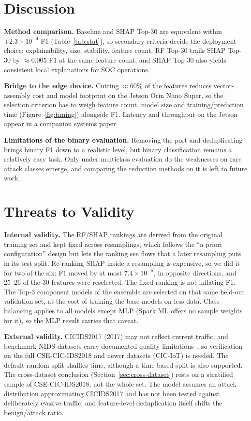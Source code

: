\documentclass[11pt,conference,a4paper]{IEEEtran}
\begin{document}
\section{Discussion}
\label{sec:discuss}

\textbf{Method comparison.} Baseline and SHAP Top-30 are equivalent within $\pm2.3\times10^{-4}$ F1 (Table~\ref{tab:stat}), so secondary criteria decide the deployment choice: explainability, size, stability, feature count. RF Top-30 trails SHAP Top-30 by $\approx$0.005 F1 at the same feature count, and SHAP Top-30 also yields consistent local explanations for SOC operations.

\textbf{Bridge to the edge device.} Cutting $\approx$60\% of the features reduces vector-assembly cost and model footprint on the Jetson Orin Nano Super, so the selection criterion has to weigh feature count, model size and training/prediction time (Figure~\ref{fig:timing}) alongside F1. Latency and throughput on the Jetson appear in a companion systems paper.

\textbf{Limitations of the binary evaluation.} Removing the port and deduplicating brings binary F1 down to a realistic level, but binary classification remains a relatively easy task. Only under multiclass evaluation do the weaknesses on rare attack classes emerge, and comparing the reduction methods on it is left to future work.

\section{Threats to Validity}
\label{sec:threats}

\textbf{Internal validity.} The RF/SHAP rankings are derived from the original training set and kept fixed across resamplings, which follows the ``a priori configuration'' design but lets the ranking see flows that a later resampling puts in its test split. Re-ranking SHAP inside a resampling is expensive, so we did it for two of the six: F1 moved by at most $7.4\times10^{-5}$, in opposite directions, and 25--26 of the 30 features were reselected. The fixed ranking is not inflating F1. The Top-3 component models of the ensemble are selected on that same held-out validation set, at the cost of training the base models on less data. Class balancing applies to all models except MLP (Spark ML offers no sample weights for it), so the MLP result carries that caveat.

\textbf{External validity.} CICIDS2017 (2017) may not reflect current traffic, and benchmark NIDS datasets carry documented quality limitations~\cite{goldschmidt2025datasets}, so verification on the full CSE-CIC-IDS2018 and newer datasets (CIC-IoT) is needed. The default random split shuffles time, although a time-based split is also supported. The cross-dataset conclusion (Section~\ref{sec:cross-dataset}) rests on a stratified sample of CSE-CIC-IDS2018, not the whole set. The model assumes an attack distribution approximating CICIDS2017 and has not been tested against deliberately evasive traffic, and feature-level deduplication itself shifts the benign/attack ratio.
\end{document}
